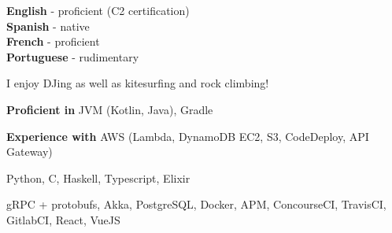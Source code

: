 \documentclass[9pt]{developercv}
\begin{document}
    \begin{minipage}[t]{0.45\textwidth}
        \vspace{-\baselineskip} %


        \vspace{-0.5em}
        \textbf{English} - proficient (C2 certification)\\
        \textbf{Spanish} - native\\
        \textbf{French} - proficient\\
        \textbf{Portuguese} - rudimentary\\



        \vspace{-0.5em}
        I enjoy DJing as well as kitesurfing and rock climbing!

    \end{minipage}
    \hfill
    \hspace{0.05\textwidth}
    \begin{minipage}[t]{0.5\textwidth}
        \vspace{-\baselineskip} %


        \vspace{-0.5em}
        \textbf{Proficient in} JVM (Kotlin, Java), Gradle

        \vspace{0.6em}
        \textbf{Experience with}
        AWS (Lambda, DynamoDB EC2, S3, CodeDeploy, API Gateway)

        \vspace{0.6em}

        Python, C, Haskell, Typescript, Elixir

        \vspace{0.6em}

        gRPC + protobufs, Akka, PostgreSQL, Docker, APM, ConcourseCI, TravisCI, GitlabCI, React,
        VueJS

    \end{minipage}

\end{document}
